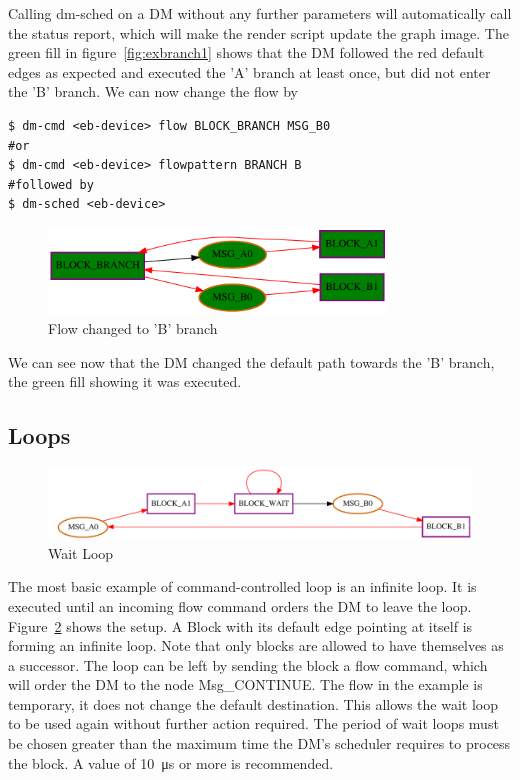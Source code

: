 Calling dm-sched on a DM without any further parameters will automatically call the status report, which will make the render script update the graph image. The green fill in figure~\ref{fig:exbranch1} shows that the DM followed the red default edges as expected and executed the 'A' branch at least once, but did not enter the 'B' branch. We can now change the flow by
%
\begin{lstlisting}[style = customshell]
$ dm-cmd <eb-device> flow BLOCK_BRANCH MSG_B0
#or
$ dm-cmd <eb-device> flowpattern BRANCH B
#followed by
$ dm-sched <eb-device>
\end{lstlisting}
%
\begin{figure}[H]
   \centering
   \def\svgwidth{0.5\textwidth}
   \includegraphics*[width=0.8\textwidth,keepaspectratio]{Figures/exbranch2}
   \caption{ Flow changed to 'B' branch }
   \label{fig:exbranch2}
\end{figure}

We can see now that the DM changed the default path towards the 'B' branch, the green fill showing it was executed.

\subsection{Loops}
\label{ssec:exwloop}
%
\begin{figure}[H]
   \centering
   \def\svgwidth{1.0\textwidth}
   \includegraphics*[width=1.0\textwidth,keepaspectratio]{Figures/exwloop}
   \caption{ Wait Loop }
   \label{fig:exwloop}
\end{figure}



The most basic example of command-controlled loop is an infinite loop. It is executed until an incoming flow command orders the DM to leave the loop.
Figure~\ref{fig:exwloop} shows the setup. A Block with its default edge pointing at itself is forming an infinite loop. Note that only blocks are allowed to have themselves as a successor.
The loop can be left by sending the block a flow command, which will order the DM to the node Msg\_CONTINUE. The flow in the example is temporary, it does not change the default destination. This allows the wait loop to be used again without further action required. The period of wait loops must be chosen greater than the maximum time the DM's scheduler requires to process the block. A value of \SI{10}{\micro\second} or more is recommended.

